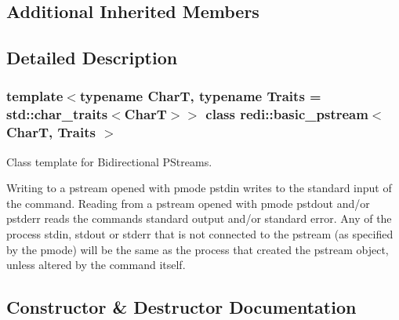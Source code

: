 \subsection*{Additional Inherited Members}


\subsection{Detailed Description}
\subsubsection*{template$<$typename CharT, typename Traits = std\+::char\+\_\+traits$<$\+Char\+T$>$$>$\newline
class redi\+::basic\+\_\+pstream$<$ Char\+T, Traits $>$}

Class template for Bidirectional P\+Streams. 

Writing to a pstream opened with {\ttfamily pmode} {\ttfamily pstdin} writes to the standard input of the command. Reading from a pstream opened with {\ttfamily pmode} {\ttfamily pstdout} and/or {\ttfamily pstderr} reads the command\textquotesingle{}s standard output and/or standard error. Any of the process\textquotesingle{} {\ttfamily stdin}, {\ttfamily stdout} or {\ttfamily stderr} that is not connected to the pstream (as specified by the {\ttfamily pmode}) will be the same as the process that created the pstream object, unless altered by the command itself. 

\subsection{Constructor \& Destructor Documentation}
\mbox{\label{classredi_1_1basic__pstream_a0e0854f94230e9685cf4b02d3115008c}} 
